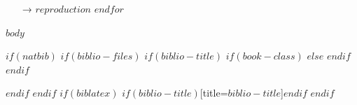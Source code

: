 \documentclass[10pt,a4paper,onecolumn]{article}
\begin{document}
\begin{rebox}
\small
\begin{flushleft}
\begin{itemize}
  $for(reproduction)$
  \item[→] $reproduction$
  $endfor$
\end{itemize}\par
\end{flushleft}
\end{rebox}


$body$

{\sffamily \small
$if(natbib)$
  $if(biblio-files)$
    $if(biblio-title)$
      $if(book-class)$
        \renewcommand\bibname{$biblio-title$}
      $else$
        \renewcommand\refname{$biblio-title$}
      $endif$
    $endif$
    
  $endif$
$endif$
$if(biblatex)$
  \printbibliography$if(biblio-title)$[title=$biblio-title$]$endif$
$endif$
}
\end{document}
